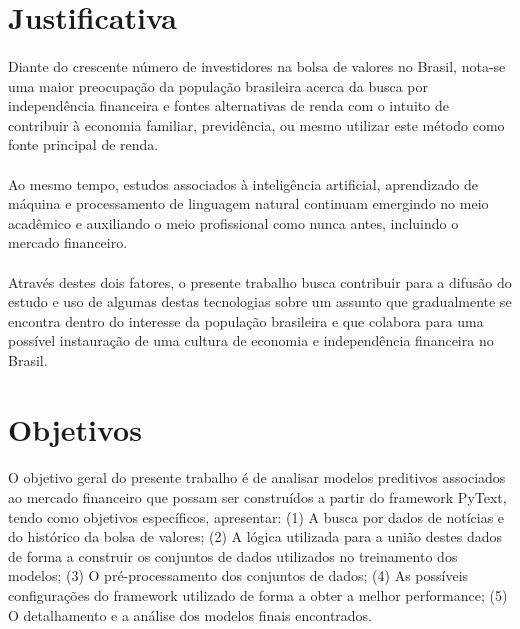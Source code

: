 \documentclass[grad,numbers]{coppe}
\begin{document}
		\section{Justificativa}
			\paragraph{}Diante do crescente número de investidores na bolsa de valores no Brasil, nota-se uma maior preocupação da população brasileira acerca da busca por independência financeira e fontes alternativas de renda com o intuito de contribuir à economia familiar, previdência, ou mesmo utilizar este método como fonte principal de renda\cite{bovespa-investors-growth}.
			\paragraph{}Ao mesmo tempo, estudos associados à inteligência artificial, aprendizado de máquina e processamento de linguagem natural continuam emergindo no meio acadêmico e auxiliando o meio profissional como nunca antes, incluindo o mercado financeiro\cite{ai-in-financial-growth}.
			\paragraph{}Através destes dois fatores, o presente trabalho busca contribuir para a difusão do estudo e uso de algumas destas tecnologias sobre um assunto que gradualmente se encontra dentro do interesse da população brasileira e que colabora para uma possível instauração de uma cultura de economia e independência financeira no Brasil.
		
		\section{Objetivos}
			\paragraph{}O objetivo geral do presente trabalho é de analisar modelos preditivos associados ao mercado financeiro que possam ser construídos a partir do framework PyText, tendo como objetivos específicos, apresentar: (1) A busca por dados de notícias e do histórico da bolsa de valores; (2) A lógica utilizada para a união destes dados de forma a construir os conjuntos de dados utilizados no treinamento dos modelos; (3) O pré-processamento dos conjuntos de dados; (4) As possíveis configurações do framework utilizado de forma a obter a melhor performance; (5) O detalhamento e a análise dos modelos finais encontrados.
		
\end{document}
